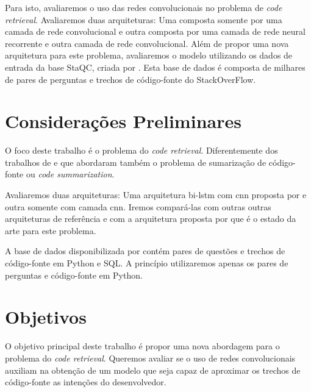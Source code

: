 Para isto, avaliaremos o uso das redes convolucionais no problema de \textit{code retrieval}. Avaliaremos duas arquiteturas: Uma composta somente por uma camada de rede convolucional e outra composta por uma camada de rede neural recorrente e outra camada de rede convolucional. Além de propor uma nova arquitetura para este problema, avaliaremos o modelo utilizando os dados de entrada da base StaQC, criada por \cite{yao-2018}. Esta base de dados é composta de milhares de pares de perguntas e trechos de código-fonte do StackOverFlow.



\section{Considerações Preliminares}
\label{sec:consideracoes_preliminares}

O foco deste trabalho é o problema do \textit{code retrieval}. Diferentemente dos trabalhos de \cite{iyer-etal-2016-summarizing} e \cite{Allamanis-bimodal-source-code-natural-language:2015} que abordaram também o problema de sumarização de código-fonte ou \textit{code summarization}. 

Avaliaremos duas arquiteturas: Uma arquitetura bi-\acrshort{lstm} com \acrshort{cnn} proposta por \cite{tan-lstm-qa} e outra somente com camada \acrshort{cnn}. Iremos compará-las com outras outras arquiteturas de referência e com a arquitetura proposta por \cite{cambronero-deep-learning-code-search:2019} que é o estado da arte para este problema.

A base de dados disponibilizada por \cite{yao-2018} contém pares de questões e trechos de código-fonte em Python e SQL. A princípio utilizaremos apenas os pares de perguntas e código-fonte em Python.


\section{Objetivos}
\label{sec:objetivo}

O objetivo principal deste trabalho é propor uma nova abordagem para o problema do \textit{code retrieval}. Queremos avaliar se o uso de redes convolucionais auxiliam na obtenção de um modelo que seja capaz de aproximar os trechos de código-fonte as intenções do desenvolvedor.

